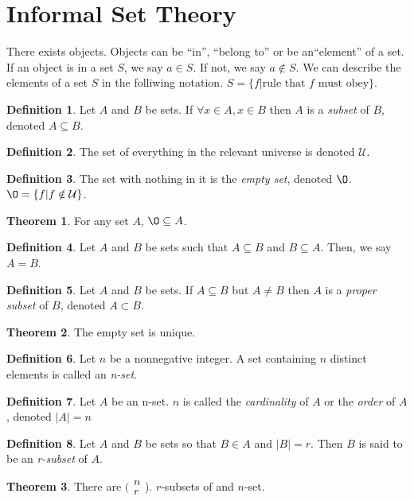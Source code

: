 \documentclass[11pt]{article}
\theoremstyle{definition}
\newtheorem{theorem}{Theorem}[section]
\newtheorem{definition}{Definition}[section]
\begin{document}
\section{Informal Set Theory}
There exists objects. Objects can be ``in'', ``belong to'' or be an``element'' of a set. If an object is in a set $S$, we say $a \in S$. If not, we say $a \notin S$. We can describe the elements of a set $S$ in the folliwing notation. $S = \{f \vert \text{rule that $f$ must obey} \}$.
\begin{definition}
    Let $A$ and $B$ be sets. If $\forall x \in A, x \in B$ then $A$ is a \emph{subset} of $B$, denoted $A \subseteq B$.
\end{definition}
\begin{definition}
    The set of everything in the relevant universe is denoted $\mathcal{U}$.
\end{definition}
\begin{definition}
    The set with nothing in it is the \emph{empty set}, denoted $\O$. $\O = \{ f \vert f \notin \mathcal{U} \}$.
\end{definition}
\begin{theorem}
For any set $A$, $\O \subseteq A$.
\end{theorem}
\begin{definition}
Let $A$ and $B$ be sets such that $A \subseteq B$ and $B \subseteq A$. Then, we say $A=B$.
\end{definition}
\begin{definition}
Let $A$ and $B$ be sets. If $A \subseteq B$ but $A \neq B$ then $A$ is a \emph{proper subset} of $B$, denoted $A \subset B$.
\end{definition}
\begin{theorem}
The empty set is unique.
\end{theorem}
\begin{definition}
    Let $n$ be a nonnegative integer. A set containing $n$ distinct elements is called an \emph{n-set}.
\end{definition}
\begin{definition}
    Let $A$ be an n-set. $n$ is called the \emph{cardinality} of $A$ or the \emph{order} of $A$, denoted $\vert A \vert = n$
\end{definition}
\begin{definition}
    Let $A$ and $B$ be sets so that $B \in A$ and $\vert B \vert = r$. Then $B$ is said to be an \emph{r-subset} of $A$.
\end{definition}
\begin{theorem}
    There are $(\begin{smallmatrix} n\\r \end{smallmatrix}$). $r$-subsets of and $n$-set.
\end{theorem}
\end{document}
